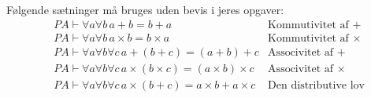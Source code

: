 Følgende sætninger må bruges uden bevis i jeres opgaver:
\begin{align*}
    &PA \vdash \forall a \forall b \, a+b = b+a &\text{Kommutivitet af $+$} \\
    &PA \vdash \forall a \forall b \, a \times b = b \times a &\text{Kommutivitet af $\times$} \\
    &PA \vdash \forall a \forall b \forall c \, a+(b+c) = (a+b)+c &\text{Associvitet af $+$} \\
    &PA \vdash \forall a \forall b \forall c \, a\times(b\times c) = (a\times b)\times c &\text{Associvitet af $\times$} \\
    &PA \vdash \forall a \forall b \forall c \, a\times (b +c) = a \times b + a \times c &\text{Den distributive lov}
\end{align*}

\ifdefined\startPeano\fi
